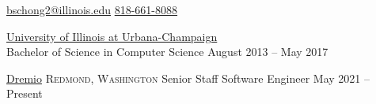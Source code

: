 \documentclass[10pt,letterpaper]{article}
\begin{document}

\nobreakvspace{0.3em}

\noindent
\href{mailto:bschong2.at.illinois.dot.edu}{bschong2\mbox{}@\mbox{}illinois.edu}
\sbull
\href{tel:555-555-5555}{818-661-8088}


\headedsection
  {\href{http://www.illinois.edu/}{University of Illinois at Urbana-Champaign}}
  {
    \textsc{
    }\\
    \headedsubsection
      {Bachelor of Science in Computer Science}
      {August 2013 -- May 2017}
  }

\spacedhrule{0.5em}{-0.4em}


\headedsection
  {\href{https://www.dremio.com/}{Dremio}}
  {\textsc{Redmond, Washington}}{
    \headedsubsection
      {Senior Staff Software Engineer}
      {May 2021 -- Present}
      {}
  }
\end{document}
